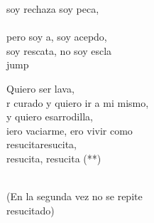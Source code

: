 \begin{cancion}[Resucitados][]
	soy rechaza soy peca, \\
	\jump\\
	pero soy a, soy acepdo, \\
	soy rescata, no soy escla \\jump\\
	\begin{chorus}%
	Quiero  ser lava, \\
	r curado y quiero ir a mi mismo, \\
	y quiero esarrodilla, \\
	iero vaciarme, ero vivir como\\
	resucitaresucita, \\
	resucita, resucita (**) \\
	\end{chorus}%
	\jump\\
(En la segunda vez no se repite\\
resucitado)\\
\end{cancion}%
